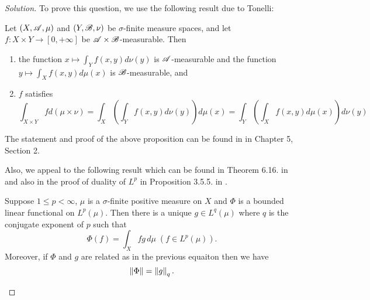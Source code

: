 \begin{proof}[Solution]

To prove this question, we use the following result due to Tonelli:

\begin{proposition}[Tonelli]
Let $\left( X, {\mathscr A}, \mu \right)$ and $\left( Y, {\mathscr B} , \nu \right)$ be $\sigma$-finite measure spaces, and let $f: X \times Y \to [0, + \infty]$ be ${\mathscr A} \times {\mathscr B}$-measurable. Then 
\begin{enumerate}[label=(\alph*)]
\item the function $x \mapsto \int_{Y} f\left( x,y \right) d\nu \left( y \right)$ is ${\mathscr A}$-measurable and the function $y \mapsto \int_{X} f\left( x,y \right) d\mu \left( x \right)$ is ${\mathscr B}$-measurable, and 
\item $f$ satisfies
\begin{equation*}
\int_{X\times Y} f d\left( \mu \times \nu  \right) = \int_{X} \left( \int_{Y} f\left( x,y \right) d\nu \left( y \right) \right)d\mu \left( x \right) = \int_{Y} \left( \int_{X} f\left( x,y \right) d\mu \left( x \right) \right) d\nu \left( y \right)
\end{equation*}
\end{enumerate}
\label{thm:tonelli}
\end{proposition}

The statement and proof of the above proposition can be found in \cite{MR3098996} in Chapter 5, Section 2.

Also, we appeal to the following result which can be found in Theorem 6.16. in  \cite{MR0344043} and also in the proof of duality of $L^{p}$ in Proposition 3.5.5. in \cite{MR3098996}.

\begin{theorem}
Suppose $1 \le p <\infty$, $\mu$ is a $\sigma$-finite positive measure on $X$ and $\Phi$ is a bounded linear functional on $L^{p} \left( \mu \right)$. Then there is a unique $g \in L^{q} \left( \mu \right)$ where $q$ is the conjugate exponent of $p$ such that 
\begin{equation*}
\Phi \left( f \right) =\int_{X} fg \, d \mu \; \left( f\in L^{p} \left( \mu \right) \right).
\end{equation*}
Moreover, if $\Phi$ and $g$ are related as in the previous equaiton then we have
\begin{equation*}
\left\lVert \Phi \right\rVert = \left\lVert g \right\rVert_{q}.
\end{equation*}
\label{thm:duality}
\end{theorem}


\end{proof}

